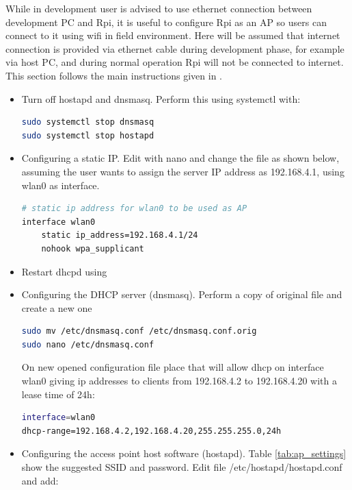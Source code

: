 While in development user is advised to use ethernet connection between development PC and \gls{Rpi}, it is useful to configure \gls{Rpi} as an \gls{AP} so users can connect to it using wifi in field environment. Here will be assumed that internet connection is provided via ethernet cable during development phase, for example via host PC, and during normal operation \gls{Rpi} will not be connected to internet. This section follows the main instructions given in \cite{raspberry_AP}.
\begin{itemize}
	\tightlist
	\item Turn off hostapd and dnsmasq. Perform this using systemctl with:
	\begin{lstlisting}[frame=none,language=bash,backgroundcolor=\color{gray!15},numbers=none,		basicstyle=\ttfamily]
sudo systemctl stop dnsmasq
sudo systemctl stop hostapd
\end{lstlisting}
	\item Configuring a static IP. Edit  with nano and change the file as shown below, assuming the user wants to assign the server IP address as 192.168.4.1, using wlan0 as interface.
	\begin{lstlisting}[frame=none,language=bash,backgroundcolor=\color{gray!15},numbers=none,		basicstyle=\ttfamily]
# static ip address for wlan0 to be used as AP
interface wlan0
    static ip_address=192.168.4.1/24
    nohook wpa_supplicant
\end{lstlisting}
   	\item Restart dhcpd using 
   	\item Configuring the DHCP server (dnsmasq). Perform a copy of original file and create a new one
\begin{lstlisting}[frame=none,language=bash,backgroundcolor=\color{gray!15},numbers=none,		basicstyle=\ttfamily]
sudo mv /etc/dnsmasq.conf /etc/dnsmasq.conf.orig  
sudo nano /etc/dnsmasq.conf
\end{lstlisting}
   	On new opened configuration file place that will allow dhcp on interface wlan0 giving ip addresses to clients from 192.168.4.2 to 192.168.4.20 with a lease time of 24h:
   	\begin{lstlisting}[frame=none,language=bash,backgroundcolor=\color{gray!15},numbers=none,		basicstyle=\ttfamily]
interface=wlan0
dhcp-range=192.168.4.2,192.168.4.20,255.255.255.0,24h
\end{lstlisting}
   	\item Configuring the access point host software (hostapd). Table \ref{tab:ap_settings} show the suggested SSID and password. Edit file /etc/hostapd/hostapd.conf and add:

\end{itemize}
